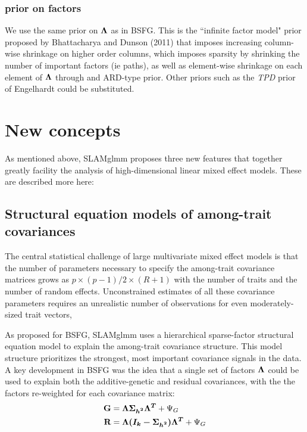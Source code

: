\documentclass[11pt]{amsart}
\newcommand*{\B}[1]{\ifmmode\bm{#1}\else\textbf{#1}\fi}
\begin{document}
\subsubsection{prior on factors}
We use the same prior on $\B{\Lambda}$ as in BSFG. This is the ``infinite factor model" prior proposed by Bhattacharya and Dunson (2011) that imposes increasing column-wise shrinkage on higher order columns, which imposes sparsity by shrinking the number of important factors (ie paths), as well as element-wise shrinkage on each element of $\B{\Lambda}$ through and ARD-type prior. Other priors such as the \emph{TPD} prior of Engelhardt could be substituted.

\section{New concepts}
As mentioned above, SLAMglmm proposes three new features that together greatly facility the analysis of high-dimensional linear mixed effect models. These are described more here:

\subsection{Structural equation models of among-trait covariances}
The central statistical challenge of large multivariate mixed effect models is that the number of parameters necessary to specify the among-trait covariance matrices grows as $p\times(p-1)/2 \times (R+1)$ with the number of traits and the number of random effects. Unconstrained estimates of all these covariance parameters requires an unrealistic number of observations for even moderately-sized trait vectors,

As proposed for BSFG, SLAMglmm uses a hierarchical sparse-factor structural equation model to explain the among-trait covariance structure. This model structure prioritizes the strongest, most important covariance signals in the data. A key development in BSFG was the idea that a single set of factors $\B{\Lambda}$ could be used to explain both the additive-genetic and residual covariances, with the the factors re-weighted for each covariance matrix:
\begin{align}\begin{split}
\B{G} &= \B{\Lambda \Sigma_{h^2} \Lambda^T} + \Psi_G \\
\B{R} &= \B{\Lambda (\B{I}_k - \Sigma_{h^2}) \Lambda^T} + \Psi_G \\
\end{split} \end{align}
\end{document}

